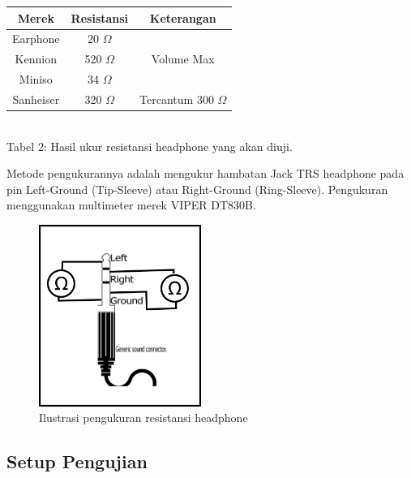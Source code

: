 \documentclass[12pt,]{article}
\begin{document}
	\begin{center}
		\begin{tabular}{ |c|c|c| } 
			\hline
			Merek & Resistansi & Keterangan \\ 
			\hline
			Earphone & 20 $\Omega$ & \\ 
			\hline
			Kennion & 520 $\Omega$ & Volume Max \\ 
			\hline
			Miniso & 34 $\Omega$ & \\ 
			\hline
			Sanheiser & 320 $\Omega$ & Tercantum 300 $\Omega$ \\ 
			\hline
		\end{tabular}\\
		\hfill \break
	Tabel 2: Hasil ukur resistansi headphone yang akan diuji.
	\end{center}
	
	Metode pengukurannya adalah mengukur hambatan Jack TRS headphone pada pin Left-Ground (Tip-Sleeve) atau Right-Ground (Ring-Sleeve).
	Pengukuran menggunakan multimeter merek VIPER DT830B.
	
	\begin{figure}[!ht]
		\centering
		\includegraphics[width=150pt]{images/ohmcheck}
		\caption{Ilustrasi pengukuran resistansi headphone}
	\end{figure}

	\subsection{Setup Pengujian}
	
\end{document}
